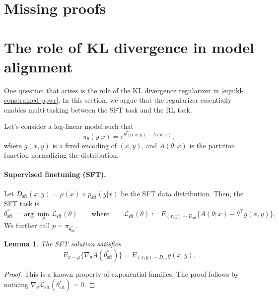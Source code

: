 \documentclass{article}
\newcommand{\p}{\pi_{\text{sft}}}
\newcommand{\sft}{\text{sft}}
\renewcommand{\p}{{p}}
\newtheorem{lemma}{Lemma}
\begin{document}
%
%




%
\clearpage
\appendix
%

\section{Missing proofs}\label{app:proofs}


\clearpage

%

%
%
%
%
%
%
%
%
%
%
%
    
%
%
%
%
%
%
%
%
%
%
%
%

%

%
%

%

\clearpage
\section{The role of KL divergence in model alignment}
\label{app:role-KL}

One question that arises is the role of the KL divergence regularizer in \cref{eqn:kl-constrained-ppwr}. In this section, we argue that the regularizer essentially enables multi-tasking between the SFT task and the RL task. 

Let's consider a log-linear model such that 
\begin{equation}
    \pi_\theta(y|x) = e^{\theta^T g(x, y) - A(\theta; x)} ,
\end{equation}
where $g(x,y)$ is  a fixed encoding of $(x, y)$, and $A(\theta;x)$ is the partition function normalizing the distribution.

\paragraph{Supervised finetuning (SFT).}
Let $D_\sft(x, y) = \mu(x) \times p_\sft(y|x)$ be the SFT data distribution. 
Then, the SFT task is
\begin{equation}
    {\theta}^*_\sft = \arg\min_\theta \mathcal{L}_\sft(\theta) \quad \quad \text{where} \quad \quad \mathcal{L}_\sft(\theta) := E_{(x, y) \sim D_\sft} \{ A(\theta; x) - \theta^\top  g(x, y)\},
\end{equation}
We further call $\p = \pi_{\theta^*_\sft}$.
\begin{lemma}
The SFT solution satisfies
\begin{equation}
    E_{x\sim \mu} \{\nabla_\theta A(\theta^*_\sft)\} = E_{(x,y) \sim D_\sft} g(x,y).
\end{equation}
\vspace{-.3in}
\label{lem:sft}
\end{lemma}
\begin{proof}
    This is a known property of exponential families. The proof follows by noticing  $\nabla_\theta \mathcal{L}_\sft(\theta^*_\sft) = 0.$
\end{proof}
\end{document}
